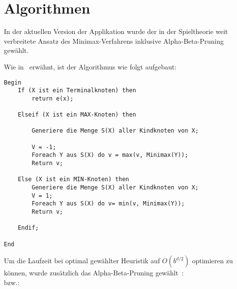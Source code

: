 \section{Algorithmen}
\label{sec:algorithms}
In der aktuellen Version der Applikation wurde der in der Spieltheorie weit verbreitete Ansatz des Minimax-Verfahrens inklusive Alpha-Beta-Pruning gewählt.

Wie in~\cite{eckerle2014spieltheorie} erwähnt, ist der Algorithmus wie folgt aufgebaut:\\

\begin{lstlisting}
Begin
    If (X ist ein Terminalknoten) then 
        return e(x);

    Elseif (X ist ein MAX-Knoten) then

        Generiere die Menge S(X) aller Kindknoten von X;

        V = -1;
        Foreach Y aus S(X) do v = max(v, Minimax(Y));
        Return v;

    Else (X ist ein MIN-Knoten) then
        Generiere die Menge S(X) aller Kindknoten von X;
        V = 1;
        Foreach Y aus S(X) do v= min(v, Minimax(Y));
        Return v;

    Endif;

End
\end{lstlisting}

Um die Laufzeit bei optimal gewählter Heuristik auf $O(b^{d/2})$ optimieren zu können, wurde zusätzlich das Alpha-Beta-Pruning gewählt~\parencite{eckerle2014spieltheorie}:\\



bzw.:\\


